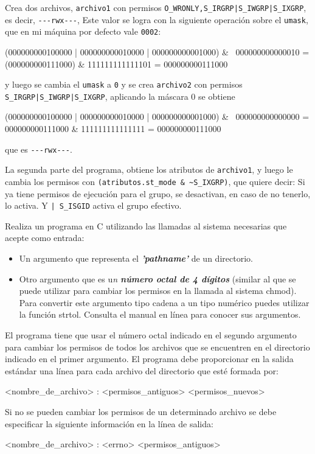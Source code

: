 {\color{blue} Crea dos archivos, \verb!archivo1! con permisos \verb!O_WRONLY,S_IRGRP|S_IWGRP|S_IXGRP!, es decir, \verb!---rwx---!, Este valor se logra con la siguiente operación sobre el \verb!umask!, que en mi máquina por defecto vale \verb!0002!:
\begin{cppcode}
(000000000100000 | 000000000010000 | 000000000001000) 
&           ~000000000000010 
= (000000000111000) & 111111111111101 
= 000000000111000
\end{cppcode}
 y luego se cambia el \verb!umask! a \verb!0! y se crea \verb!archivo2! con permisos \verb!S_IRGRP|S_IWGRP|S_IXGRP!, aplicando la máscara 0 se obtiene 
\begin{cppcode}
(000000000100000 | 000000000010000 | 000000000001000) 
&           ~000000000000000  
= 000000000111000 & 111111111111111 
= 000000000111000
\end{cppcode}
que es \verb!---rwx---!.

La segunda parte del programa, obtiene los atributos de \verb!archivo1!, y luego le cambia los permisos con \verb!(atributos.st_mode & ~S_IXGRP)!, que quiere decir: Si ya tiene permisos de ejecución para el grupo, se desactivan, en caso de no tenerlo, lo activa. Y \verb!| S_ISGID! activa el grupo efectivo.
}


\begin{exercise}
Realiza un programa en C utilizando las llamadas al sistema necesarias que
acepte como entrada:
\begin{itemize}
	\item Un argumento que representa el \emph{\textbf{'pathname'}} de un directorio.
    \item Otro argumento que es u\emph{n \textbf{número octal de 4 dígitos}} (similar al que se puede utilizar
para cambiar los permisos en la llamada al sistema chmod). Para convertir este
argumento tipo cadena a un tipo numérico puedes utilizar la función strtol. Consulta
el manual en línea para conocer sus argumentos.
\end{itemize}
El programa tiene que usar el número octal indicado en el segundo argumento para cambiar
los permisos de todos los archivos que se encuentren en el directorio indicado en el primer
argumento.
El programa debe proporcionar en la salida estándar una línea para cada archivo del
directorio que esté formada por:
\begin{bashcode}
<nombre_de_archivo> : <permisos_antiguos> <permisos_nuevos>
\end{bashcode}
Si no se pueden cambiar los permisos de un determinado archivo se debe especificar la
siguiente información en la línea de salida:
\begin{bashcode}
<nombre_de_archivo> : <errno> <permisos_antiguos>
\end{bashcode}


\end{exercise}